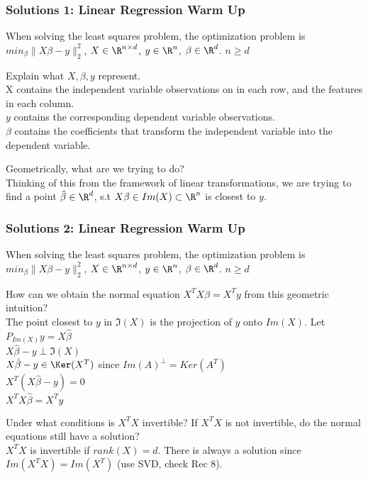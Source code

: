 \documentclass{beamer}
\renewenvironment{enumerate}%
{\begin{list}{\arabic{enumi}.}%
      {\setlength{\leftmargin}{2.5em}%
       \setlength{\itemsep}{-\parsep}%
       \setlength{\topsep}{-\parskip}%
       \usecounter{enumi}}%
 }{\end{list}}
\begin{document}
\begin{frame}
\frametitle{Solutions 1: Linear Regression Warm Up}
When solving the least squares problem, the optimization problem is $min_\beta \|X\beta - y \|_2^2$, $X\in \R^{n\times d}$, $y \in\R^n$, $\beta\in\R^d$.
$n\geq d$
\begin{solution}
\begin{enumerate}
\item Explain what $X,\beta, y$ represent.\\
X contains the independent variable observations on in each row, and the features in each column.\\
$y$ contains the corresponding dependent variable observations.\\
$\beta$ contains the coefficients that transform the independent variable into the dependent variable.\\
\medskip
\item Geometrically, what are we trying to do?\\

Thinking of this from the framework of linear transformations,
we are trying to find a point $\hat{\beta}\in \R^d$, s.t $X\beta \in Im(X) \subset \R^n$ is closest to $y$.
\end{enumerate}
\end{solution}


\end{frame}


\begin{frame}
\frametitle{Solutions 2: Linear Regression Warm Up}
When solving the least squares problem, the optimization problem is $min_\beta \|X\beta - y \|_2^2$, $X\in \R^{n\times d}$, $y \in\R^n$, $\beta\in\R^d$.
$n\geq d$
\begin{solution}
\begin{enumerate}
\item[3.] How can we obtain the normal equation $X^TX\beta = X^Ty$ from this geometric intuition?\\
The point closest to $y$ in $\Im(X)$ is the projection of $y$ onto $Im(X)$. Let $P_{Im(X)}y= X\hat{\beta}$\\
\quad $X\hat{\beta} - y \perp \Im(X)$ \\
\quad $X\hat{\beta} - y \in \Ker(X^T)$ \quad since $Im(A)^{\perp} = Ker(A^T)$\\
\quad $X^T(X \hat{\beta} - y) = 0$\\
\quad $X^TX \hat{\beta} = X^Ty$\\


\item[4.] Under what conditions is $X^TX$ invertible? If $X^TX$ is not invertible, do the normal equations still have a solution?\\
$X^TX$ is invertible if $rank(X)=d$. There is always a solution since  $Im(X^TX) = Im(X^T)$ (use SVD, check Rec 8).
\end{enumerate}
\end{solution}
\end{frame}
\end{document}
